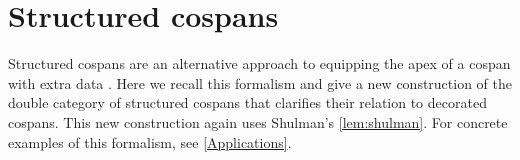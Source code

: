 \documentclass[a4paper,onecolumn, superscriptaddress,10pt, accepted=2022-03-25, issue=SS, volume=VV, shorttitle=papers/compositionality-VV-SS]{compositionalityarticle}
\newcommand{\A}{\mathsf{A}}
\newcommand{\inta}{\raisebox{.3\depth}{$\smallint\hspace{-.01in}$}}
\begin{document}
\iffalse
we have a natural isomorphism between $0_{\inta F'}$ and $G(0_{\inta F})$ given by:
\[
\begin{tikzpicture}[scale=1.5]
\node (A) at (-1,0.5) {$\scriptscriptstyle{1}$};
\node () at (4,0.66) {$\scriptscriptstyle{\cong}$};
\node (A1) at (0,0) {$\scriptscriptstyle{E(1)}$};
\node (A2) at (2,0) {$\scriptscriptstyle{E(F(0_\A))}$};
\node (A3) at (4,0) {$\scriptscriptstyle{E(F(0_\A))}$};
\node (A4) at (6,0) {$\scriptscriptstyle{F'(H(0_\A))}$};
\node (A') at (2,0.5) {$\scriptscriptstyle{F'(H(0_\A))}$};
\node (B1) at (0,1) {$\scriptscriptstyle{F'(0_{\A'})}$};
\node (B2) at (6,1) {$\scriptscriptstyle{F'(0_{\A'})}$};
\path[->,font=\scriptsize,>=angle 90]
(A) edge node [below] {$\scriptscriptstyle{E_0}$} (A1)
(A) edge node [above] {$\scriptscriptstyle{\phi_0'}$} (B1)
(A1) edge node [above] {$\scriptscriptstyle{E(\phi_0)}$} (A2)
(A2) edge node [below] {$\scriptscriptstyle{E(F(!_{0_\A}))}$} (A3)
(A3) edge node [below] {$\scriptscriptstyle{\theta_{0_\A}}$} (A4)
(A2) edge node [left] {$\scriptscriptstyle{\theta_{0_\A}}$} (A')
(B1) edge node [fill=white] {$\scriptscriptstyle{F'(H_0)}$} (A')
(A') edge node [fill=white] {$\scriptscriptstyle{F'(H(!_{0_\A}))}$} (A4)
(B2) edge node [right] {$\scriptscriptstyle{F'(H_0)}$} (A4)
(B1) edge node [above] {$\scriptscriptstyle{F'(!_{0_{\A'}})}$} (B2);
\end{tikzpicture}
\]
\fi

\section{Structured cospans} \label{Structured}

Structured cospans are an alternative approach to equipping the apex of a cospan with 
extra data \cite{BC}.    Here we recall this formalism and give a new construction of the double category of structured cospans that clarifies their 
relation to decorated cospans.   This new construction again uses Shulman's \cref{lem:shulman}. For concrete examples of this formalism, see 
\cref{Applications}.
\end{document}

